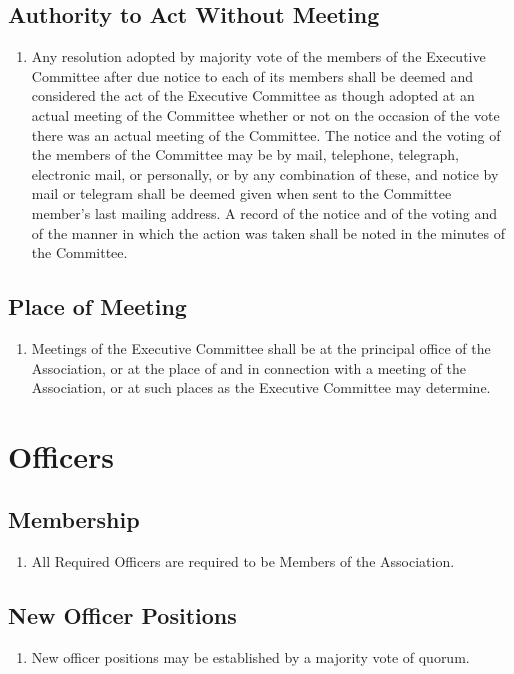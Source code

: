 \subsection{Authority to Act Without Meeting}
\begin{enumerate}
	\item Any resolution adopted by majority vote of the members of the Executive Committee after due notice to each of its members shall be deemed and considered the act of the Executive Committee as though adopted at an actual meeting of the Committee whether or not on the occasion of the vote there was an actual meeting of the Committee. The notice and the voting of the members of the Committee may be by mail, telephone, telegraph, electronic mail, or personally, or by any combination of these, and notice by mail or telegram shall be deemed given when sent to the Committee member's last mailing address. A record of the notice and of the voting and of the manner in which the action was taken shall be noted in the minutes of the Committee.
\end{enumerate}

\subsection{Place of Meeting}
\begin{enumerate}
	\item Meetings of the Executive Committee shall be at the principal office of the Association, or at the place of and in connection with a meeting of the Association, or at such places as the Executive Committee may determine.
\end{enumerate}

\section{Officers}

\subsection{Membership}
\begin{enumerate}
	\item All Required Officers are required to be Members of the Association.
\end{enumerate}

\subsection{New Officer Positions}
\begin{enumerate}
	\item New officer positions may be established by a majority vote of quorum.
\end{enumerate}

